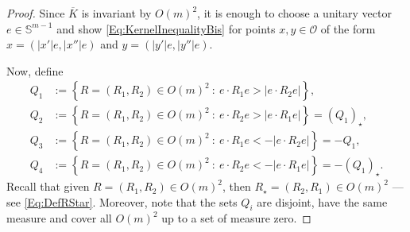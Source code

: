 \documentclass[12pt,reqno]{amsart}
\theoremstyle{definition}
\theoremstyle{remark}
\newcommand{\con}[1]{\mathbb{#1}}
\newcommand{\Sph}{\con{S}} %
\newcommand{\ocal}{\mathcal{O}}
\newcommand{\setcond}[2]{\left \{ #1 \ : \ #2  \right \}}
\numberwithin{equation}{section}
\begin{document}
\begin{proof}
	Since $\overline{K}$ is invariant by $O(m)^2$, it is enough to choose a unitary vector $e \in \Sph^{m-1}$ and show \eqref{Eq:KernelInequalityBis} for points $x, y\in \ocal$ of the form $x = (|x'|e, |x''|e)$ and $y = (|y'|e, |y''|e)$.
	
	Now, define
	\begin{equation}
	\label{Eq:DefQ}
	\begin{split}
	Q_1 &:= \setcond{R = (R_1,R_2) \in O(m)^2}{e\cdot R_1 e > |e\cdot R_2 e|},\\
	Q_2 &:= \setcond{R = (R_1,R_2) \in O(m)^2}{e\cdot R_2 e > |e\cdot R_1 e|} = (Q_1)_\star,\\
	Q_3 &:= \setcond{R = (R_1,R_2) \in O(m)^2}{e\cdot R_1 e < -|e\cdot R_2 e|} = -Q_1,\\
	Q_4 &:= \setcond{R = (R_1,R_2) \in O(m)^2}{e\cdot R_2 e < - |e\cdot R_1 e|} = -(Q_1)_\star.
	\end{split}
	\end{equation}
	Recall that given $R=(R_1,R_2)\in O(m)^2$, then $R_\star=(R_2,R_1)\in O(m)^2$ ---see \eqref{Eq:DefRStar}. Moreover, note that the sets $Q_i$ are disjoint, have the same measure and cover all $O(m)^2$ up to a set of measure zero. 
	

\end{proof}
\end{document}
